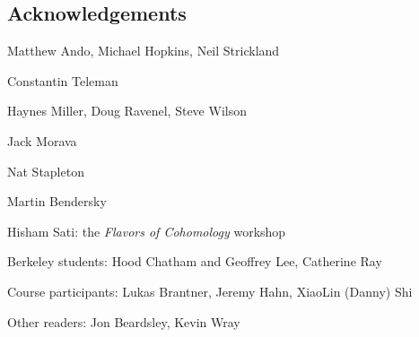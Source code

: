 


\newpage

\subsection*{Acknowledgements}

Matthew Ando, Michael Hopkins, Neil Strickland

Constantin Teleman

Haynes Miller, Doug Ravenel, Steve Wilson

Jack Morava

Nat Stapleton

Martin Bendersky



Hisham Sati: the \textit{Flavors of Cohomology} workshop

Berkeley students: Hood Chatham and Geoffrey Lee, Catherine Ray

Course participants: Lukas Brantner, Jeremy Hahn, XiaoLin (Danny) Shi

Other readers: Jon Beardsley, Kevin Wray

